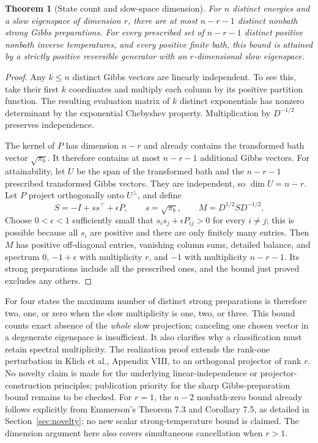 \documentclass[11pt]{article}
\newtheorem{theorem}{Theorem}
\begin{document}
\begin{theorem}[State count and slow-space dimension]\label{thm:strongdimension}
For $n$ distinct energies and a slow eigenspace of dimension $r$, there are at
most $n-r-1$ distinct nonbath strong Gibbs preparations. For every prescribed
set of $n-r-1$ distinct positive nonbath inverse temperatures, and every
positive finite bath, this bound is attained by a strictly positive reversible
generator with an $r$-dimensional slow eigenspace.
\end{theorem}
\begin{proof}
Any $k\leq n$ distinct Gibbs vectors are linearly independent. To see this,
take their first $k$ coordinates and multiply each column by its positive
partition function. The resulting evaluation matrix of $k$ distinct
exponentials has nonzero determinant by the exponential Chebyshev property.
Multiplication by $D^{-1/2}$ preserves independence.

The kernel of $P$ has dimension $n-r$ and already contains the transformed
bath vector $\sqrt{\pi_b}$. It therefore contains at most $n-r-1$ additional
Gibbs vectors. For attainability, let $U$ be the span of the transformed bath
and the $n-r-1$ prescribed transformed Gibbs vectors. They are independent,
so $\dim U=n-r$. Let $P$ project orthogonally onto $U^\perp$, and define
\[
S=-I+ss^\top+\epsilon P,\qquad s=\sqrt{\pi_b},\qquad
M=D^{1/2}SD^{-1/2}.
\]
Choose $0<\epsilon<1$ sufficiently small that
$s_is_j+\epsilon P_{ij}>0$ for every $i\ne j$; this is possible because all
$s_i$ are positive and there are only finitely many entries. Then $M$ has
positive off-diagonal entries, vanishing column sums, detailed balance, and
spectrum $0$, $-1+\epsilon$ with multiplicity $r$, and $-1$ with multiplicity
$n-r-1$. Its strong preparations include all the prescribed ones, and the
bound just proved excludes any others.
\end{proof}

For four states the maximum number of distinct strong preparations is therefore
two, one, or zero when the slow multiplicity is one, two, or three. This bound
counts exact absence of the \emph{whole} slow projection; canceling one chosen
vector in a degenerate eigenspace is insufficient. It also clarifies why a
classification must retain spectral multiplicity. The realization proof extends the rank-one perturbation in Klich et al.,
Appendix VIII, to an orthogonal projector of rank $r$. No novelty claim is made
for the underlying linear-independence or projector-construction principles;
publication priority for the sharp Gibbs-preparation bound remains to be checked.
For $r=1$, the $n-2$ nonbath-zero bound already follows explicitly from
Emmerson's Theorem 7.3 and Corollary 7.5, as detailed in
Section~\ref{sec:novelty}; no new scalar strong-temperature bound is claimed.
The dimension argument here also covers simultaneous cancellation when $r>1$.
\end{document}
